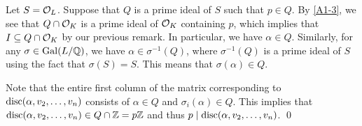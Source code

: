 \begin{pf}
    Let $S = {\cal O}_L$. Suppose that $Q$ is a prime ideal of $S$ 
    such that $p \in Q$. By \ref{A1-3}, we see that $Q \cap {\cal O}_K$ 
    is a prime ideal of ${\cal O}_K$ containing $p$, which implies that 
    $I \subseteq Q \cap {\cal O}_K$ by our previous remark. In particular, 
    we have $\alpha \in Q$. Similarly, for any $\sigma \in \operatorname{Gal}(L/\mathbb{Q})$, 
    we have $\alpha \in \sigma^{-1}(Q)$, where $\sigma^{-1}(Q)$ 
    is a prime ideal of $S$ using the fact that $\sigma(S) = S$. 
    This means that $\sigma(\alpha) \in Q$. 

    Note that the entire first column of the matrix 
    corresponding to $\operatorname{disc}(\alpha, v_2, \dots, v_n)$ 
    consists of $\alpha \in Q$ and $\sigma_i(\alpha) \in Q$. 
    This implies that $\operatorname{disc}(\alpha, v_2, \dots, v_n) \in Q \cap \mathbb{Z} = p\mathbb{Z}$ 
    and thus $p \mid \operatorname{disc}(\alpha, v_2, \dots, v_n)$. \qed 
\end{pf}